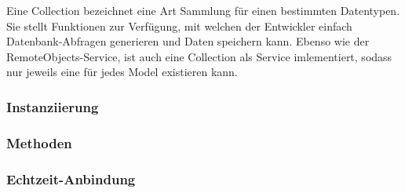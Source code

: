 Eine Collection bezeichnet eine Art Sammlung für einen bestimmten Datentypen. Sie stellt Funktionen zur Verfügung, mit welchen der Entwickler einfach Datenbank-Abfragen generieren und Daten speichern kann.
Ebenso wie der RemoteObjects-Service, ist auch eine Collection als Service imlementiert, sodass nur jeweils eine für jedes Model existieren kann.

\subsubsection{Instanziierung}

\subsubsection{Methoden}

\subsubsection{Echtzeit-Anbindung}
